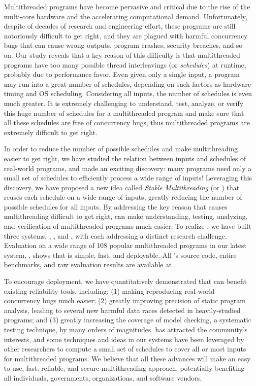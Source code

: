Multithreaded programs have become pervasive and critical due to the rise of the
multi-core hardware and the accelerating computational demand.
Unfortunately, despite of decades of research and engineering effort, these
programs are still notoriously difficult to get right, and they are plagued with
harmful concurrency bugs that can cause wrong outputs, program crashes, security
breaches, and so on. Our study reveals that a key reason of this difficulty is
that multithreaded programs have too many possible thread interleavings (or
\emph{schedules}) at runtime, probably due to performance favor. Even given 
only a single input, a program may run into a great number of schedules, 
depending on such factors as hardware timing and OS scheduling. Considering all 
inputs, the number of schedules is even much greater. It is extremely 
challenging to understand, test, analyze, or verify this huge number of 
schedules for a multithreaded program and make sure that all these schedules 
are free of concurrency bugs, thus multithreaded programs are extremely 
difficult to get right.

In order to reduce the number of possible schedules and make multithreading
easier to get right, we have studied the relation between inputs and schedules 
of real-world programs, and made an exciting discovery: many programs need only 
a small set of schedules to efficiently process a wide range of inputs! 
Leveraging this discovery, we have proposed a new idea called \emph{Stable 
Multithreading} (or \emph{\smt}) that reuses each schedule on a wide range of 
inputs, greatly reducing the number of possible schedules for all inputs. By 
addressing the key reason that causes multithreading difficult to get right, 
\smt can make understanding, testing, analyzing, and verification of 
multithreaded programs much easier. To realize \smt, we have built three \smt 
systems, \tern, \peregrine, and \parrot, with each addressing a distinct 
research challenge. Evaluation on a wide range of 108 popular multithreaded 
programs in our latest \smt system, \parrot, shows that \smt is simple, fast, 
and deployable. All \parrot's source code, entire benchmarks, and raw 
evaluation results are available at \github.

To encourage deployment, we have quantitatively demonstrated that \smt 
can benefit existing reliability tools, including: (1) making reproducing
real-world concurrency bugs much easier;  (2) greatly improving precision of
static program analysis, leading to several new harmful data races detected in
heavily-studied programs; and (3) greatly increasing the coverage of model 
checking, a systematic testing technique, by many orders of magnitudes. \smt 
has attracted the community's interests, and some techniques and ideas in our 
\smt systems have been leveraged by other researchers to compute a small set of 
schedules to cover all or most inputs for multithreaded programs. We believe 
that all these advances will make \smt an easy to use, fast, reliable, 
and secure multithreading approach, potentially benefiting all individuals, 
governments, organizations, and software vendors. 

